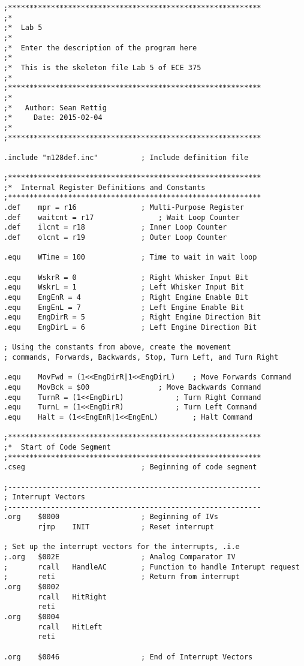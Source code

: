 \documentclass[12pt,letterpaper]{article}
\begin{document}
\begin{verbatim}
;***********************************************************
;*
;*	Lab 5
;*
;*	Enter the description of the program here
;*
;*	This is the skeleton file Lab 5 of ECE 375
;*
;***********************************************************
;*
;*	 Author: Sean Rettig
;*	   Date: 2015-02-04
;*
;***********************************************************

.include "m128def.inc"			; Include definition file

;***********************************************************
;*	Internal Register Definitions and Constants
;***********************************************************
.def	mpr = r16				; Multi-Purpose Register
.def	waitcnt = r17				; Wait Loop Counter
.def	ilcnt = r18				; Inner Loop Counter
.def	olcnt = r19				; Outer Loop Counter

.equ	WTime = 100				; Time to wait in wait loop

.equ	WskrR = 0				; Right Whisker Input Bit
.equ	WskrL = 1				; Left Whisker Input Bit
.equ	EngEnR = 4				; Right Engine Enable Bit
.equ	EngEnL = 7				; Left Engine Enable Bit
.equ	EngDirR = 5				; Right Engine Direction Bit
.equ	EngDirL = 6				; Left Engine Direction Bit

; Using the constants from above, create the movement 
; commands, Forwards, Backwards, Stop, Turn Left, and Turn Right

.equ	MovFwd = (1<<EngDirR|1<<EngDirL)	; Move Forwards Command
.equ	MovBck = $00				; Move Backwards Command
.equ	TurnR = (1<<EngDirL)			; Turn Right Command
.equ	TurnL = (1<<EngDirR)			; Turn Left Command
.equ	Halt = (1<<EngEnR|1<<EngEnL)		; Halt Command

;***********************************************************
;*	Start of Code Segment
;***********************************************************
.cseg							; Beginning of code segment

;-----------------------------------------------------------
; Interrupt Vectors
;-----------------------------------------------------------
.org	$0000					; Beginning of IVs
		rjmp 	INIT			; Reset interrupt

; Set up the interrupt vectors for the interrupts, .i.e
;.org	$002E					; Analog Comparator IV
;		rcall	HandleAC		; Function to handle Interupt request
;		reti					; Return from interrupt
.org	$0002
		rcall	HitRight
		reti
.org	$0004
		rcall	HitLeft
		reti

.org	$0046					; End of Interrupt Vectors


\end{verbatim}
\end{document}
